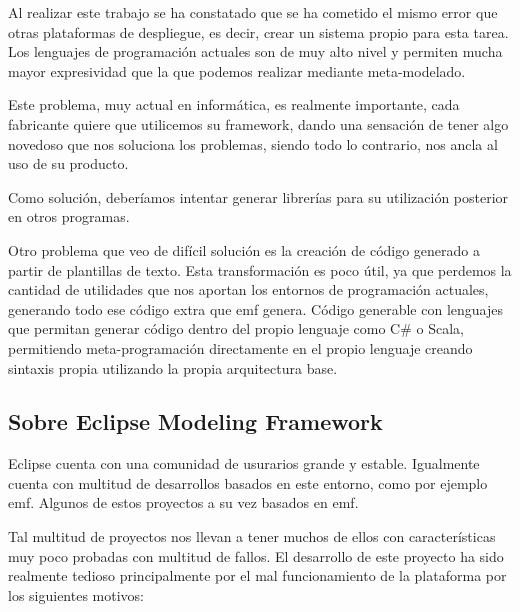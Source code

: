 Al realizar este trabajo se ha constatado que se ha cometido el mismo error que otras plataformas de despliegue, es decir, crear un sistema propio para esta tarea.
Los lenguajes de programación actuales son de muy alto nivel y permiten mucha mayor expresividad que la que podemos realizar mediante meta-modelado.

Este problema, muy actual en informática, es realmente importante, cada fabricante quiere que utilicemos su \gls{framework}, dando una sensación de tener algo novedoso que nos soluciona los problemas, siendo todo lo contrario, nos ancla al uso de su producto.

Como solución, deberíamos intentar generar librerías para su utilización posterior en otros programas.

Otro problema que veo de difícil solución es la creación de código generado a partir de plantillas de texto. Esta transformación es poco útil, ya que perdemos la cantidad de utilidades que nos aportan los entornos de programación actuales, generando todo ese código extra que \gls{emf} genera. Código generable con lenguajes que permitan generar código dentro del propio lenguaje como C\# o Scala, permitiendo meta-programación directamente en el propio lenguaje creando sintaxis propia utilizando la propia arquitectura base.


\subsection{Sobre Eclipse Modeling Framework}

Eclipse cuenta con una comunidad de usurarios grande y estable. Igualmente cuenta con multitud de desarrollos basados en este entorno, como por ejemplo \gls{emf}. Algunos de estos proyectos a su vez basados en \gls{emf}.

Tal multitud de proyectos nos llevan a tener muchos de ellos con características muy poco probadas con multitud de fallos.
El desarrollo de este proyecto ha sido realmente tedioso principalmente por el mal funcionamiento de la plataforma por los siguientes motivos:

